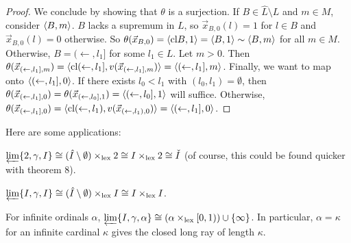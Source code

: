 \documentclass[11pt]{article}
\renewcommand{\cl}{\textrm{cl}}
\newcommand{\lexTimes}{\times_{\textrm{lex}}}
\newcommand{\vect}{\vec}
\begin{document}
\begin{proof}
    We conclude by
    showing that \(\theta\) is a surjection. If \(B\in\hat L\setminus L\)
    and \(m\in M\), consider \(\langle B,m\rangle\).
    \(B\) lacks a supremum in \(L\), so
    \(\vect x_{B,0}(l)=1\) for \(l\in B\) and \(\vect x_{B,0}(l)=0\) otherwise.
    So \(\theta(\vect x_{B,0})=\<\cl B,1\>=\<B,1\>\sim\<B,m\>\) for all
    \(m\in M\). Otherwise, \(B=(\leftarrow,l_1]\) for some \(l_1\in L\).
    Let \(m>0\).
    Then
    \(
      \theta(\vect x_{(\leftarrow,l_1],m})
        =
      \<\cl (\leftarrow,l_1],v(\vect x_{(\leftarrow,l_1],m})\>
        =
      \<(\leftarrow,l_1],m\>
    \).
    Finally, we want to map onto \(\langle(\leftarrow,l_1],0\rangle\).
    If there exists \(l_0<l_1\) with \((l_0,l_1)=\emptyset\), then
    \(
      \theta(\vect x_{(\leftarrow,l_1],0})
        =
      \theta(\vect x_{(\leftarrow,l_0],1})
        =
      \<(\leftarrow,l_0],1\>
    \)
    will suffice. Otherwise,
    \(
      \theta(\vect x_{(\leftarrow,l_1],0})
        =
      \<\cl (\leftarrow,l_1),v(\vect x_{(\leftarrow,l_1),0})\>
        =
      \<(\leftarrow,l_1],0\>
    \).
  \end{proof}

  Here are some applications:

  \begin{example}
    \(
      \varprojlim\{2,\gamma,I\}
        \cong
      (\hat I\setminus\emptyset)\lexTimes 2
        \cong
      I\lexTimes 2
        \cong
      \check I
    \) (of course, this could be found quicker with theorem 8).
  \end{example}

  \begin{example}
    \(
      \varprojlim\{I,\gamma,I\}
        \cong
      (\hat I\setminus\emptyset)\lexTimes I
        \cong
      I\lexTimes I
    \).
  \end{example}

  \begin{example}
    For infinite ordinals \(\alpha\),
    \(
      \varprojlim\{I,\gamma,\alpha\}
        \cong
      (\alpha\lexTimes[0,1))\cup\{\infty\}
    \).
    In particular, \(\alpha=\kappa\) for an infinite cardinal \(\kappa\)
    gives the closed long ray of length \(\kappa\).
  \end{example}
\end{document}
